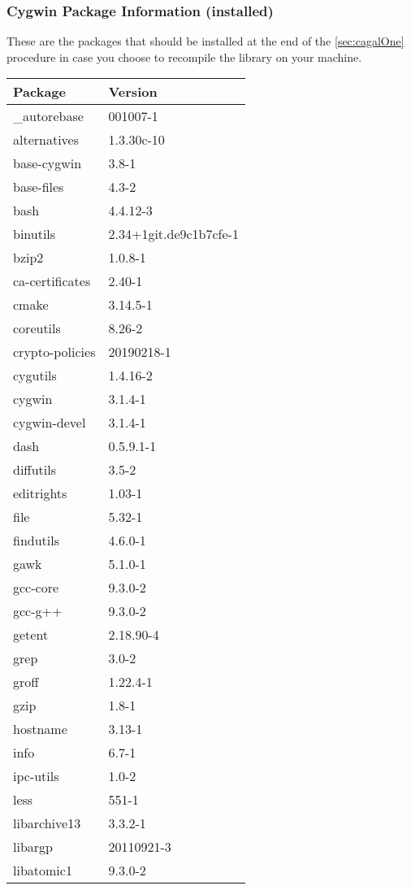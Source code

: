 \documentclass[10pt, english, openany]{report}
\begin{document}
\begin{appendices}
\subsubsection{Cygwin Package Information (installed)}
These are the packages that should be installed at the end of the \ref {sec:cagalOne} procedure in case you choose to recompile the library on your machine.
\begin{center}
\begin{tabular}{|m{4cm}|m{4cm}|}
Package & Version \\
\hline
\_autorebase & 001007-1 \\
alternatives & 1.3.30c-10 \\
base-cygwin & 3.8-1 \\
base-files & 4.3-2 \\
bash & 4.4.12-3 \\
binutils & 2.34+1git.de9c1b7cfe-1 \\
bzip2 & 1.0.8-1 \\
ca-certificates & 2.40-1 \\
cmake & 3.14.5-1 \\
coreutils & 8.26-2 \\
crypto-policies & 20190218-1 \\
cygutils & 1.4.16-2 \\
cygwin & 3.1.4-1 \\
cygwin-devel & 3.1.4-1 \\
dash & 0.5.9.1-1 \\
diffutils & 3.5-2 \\
editrights & 1.03-1 \\
file & 5.32-1 \\
findutils & 4.6.0-1 \\
gawk & 5.1.0-1 \\
gcc-core & 9.3.0-2 \\
gcc-g++ & 9.3.0-2 \\
getent & 2.18.90-4 \\
grep & 3.0-2 \\
groff & 1.22.4-1 \\
gzip & 1.8-1 \\
hostname & 3.13-1 \\
info & 6.7-1 \\
ipc-utils & 1.0-2 \\
less & 551-1 \\
libarchive13 & 3.3.2-1 \\
libargp & 20110921-3 \\
libatomic1 & 9.3.0-2 \\

\end{tabular}
\end{center}
\end{appendices}
\end{document}
